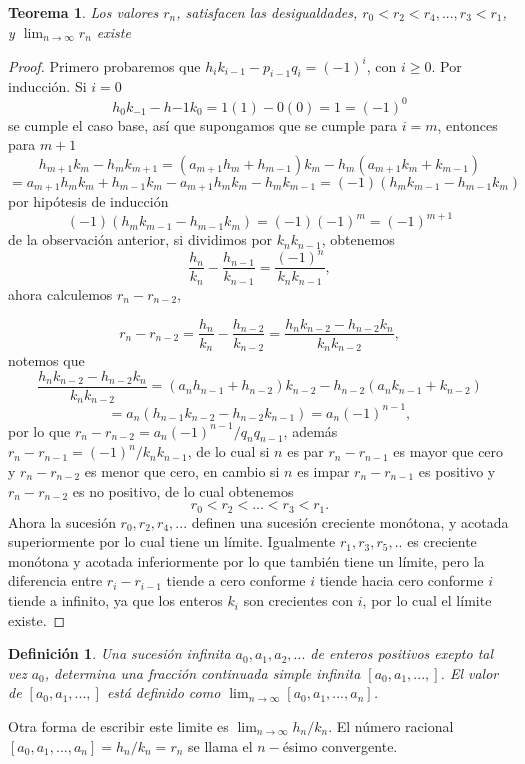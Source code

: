 \documentclass[11pt, article]{article}
\newtheorem{theorem}{Teorema} %
\newtheorem{definition}{Definición}
\begin{document}
    \begin{theorem}
    Los valores $r_n$, satisfacen las desigualdades, $r_0<r_2<r_4,...,r_3<r_1$, y $\lim_{n\to\infty}r_n$ existe 
    \end{theorem}
    \begin{proof}
        Primero probaremos que $h_ik_{i-1}-p_{i-1}q_{i}=(-1)^i$, con $i\geq 0$.
    Por inducción. Si $i=0$
        \[ 
        h_0k_{-1}-h{-1}k_0=1(1)-0(0)=1=(-1)^0
        \]
    se cumple el caso base, así que supongamos que se cumple para $i=m$, entonces para $m+1$
    \[
    h_{m+1}k_{m}-h_{m}k_{m+1}=(a_{m+1}h_{m} + h_{m-1})k_m-h_m(a_{m+1}k_m+k_{m-1})
    \]
    \[
    =a_{m+1}h_mk_m+h_{m-1}k_m-a_{m+1}h_mk_m-h_mk_{m-1}
    =(-1)(h_mk_{m-1}-h_{m-1}k_m)
    \]
    por hipótesis de inducción 
        \[
        (-1)(h_m k_{m-1}-h_{m-1}k_m)=(-1)(-1)^m=(-1)^{m+1}
        \]
    de la observación anterior, si dividimos por $k_nk_{n-1}$, obtenemos 
        \[
        \dfrac{h_n}{k_n}-\dfrac{h_{n-1}}{k_{n-1}}=\dfrac{(-1)^n}{k_nk_{n-1}},
        \]
    ahora calculemos $r_n-r_{n-2}$,
    
        \[
        r_n-r_{n-2}=\dfrac{h_n}{k_n}-\dfrac{h_{n-2}}{k_{n-2}}=\dfrac{h_nk_{n-2}-h_{n-2}k_n}{k_nk_{n-2}},
        \]
        notemos que 
        \[
        \dfrac{h_nk_{n-2}-h_{n-2}k_n}{k_nk_{n-2}}=(a_n h_{n-1}+h_{n-2})k_{n-2}-h_{n-2}(a_n k_{n-1}+k_{n-2})
        \]
        \[
        =a_n(h_{n-1}k_{n-2}-h_{n-2}k_{n-1})=a_n(-1)^{n-1},
        \]
    por lo que $r_n-r_{n-2}=a_n(-1)^{n-1}/q_nq_{n-1}$, además $r_n-r_{n-1}=(-1)^n/k_nk_{n-1}$, de lo cual si $n$ es par $r_n-r_{n-1}$ es mayor que cero y $r_n-r_{n-2}$ es menor que cero, en cambio si $n$ es impar $r_n-r_{n-1}$ es positivo y $r_n-r_{n-2}$ es no positivo, de lo cual obtenemos
    \[
    r_0<r_2<...<r_3<r_1.
    \]
    Ahora la sucesión $r_0,r_2,r_4,...$ definen una sucesión creciente monótona, y acotada superiormente por lo cual tiene un límite. Igualmente $r_1,r_3,r_5,..$ es creciente monótona y acotada inferiormente por lo que también tiene un límite, pero la diferencia entre $r_i-r_{i-1}$ tiende a cero conforme $i$ tiende hacia cero conforme $i$ tiende a infinito, ya que los enteros $k_i$ son crecientes con $i$, por lo cual el límite existe. 
    \end{proof}
    \begin{definition}
    Una sucesión infinita $a_0, a_1, a_2,...$ de enteros positivos exepto tal vez $a_0$, determina una fracción continuada simple infinita $[a_0, a_1, ..., ]$. El valor de $[a_0, a_1, ..., ]$ está definido como $\lim_{n\to\infty}[a_0, a_1, ..., a_n]$.
    \end{definition}  
    Otra forma de escribir este limite es $\lim_{n\to\infty} h_n/k_n$. El número racional $[a_0, a_1, ...,a_n]=h_n/k_n=r_n$ se llama el $n-$ésimo convergente.
\end{document}
